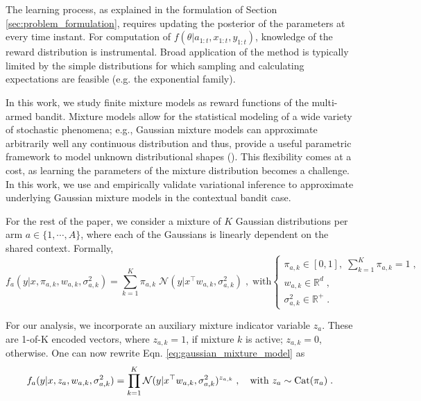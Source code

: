\documentclass[10pt]{article}
\def \Real{{\mathbb R}}
\newcommand{\eg}{e.g. }
\newcommand{\N}{\mathcal{N}}
\newcommand{\Cat}{{\rm Cat}}
\begin{document}
The learning process, as explained in the formulation of Section \ref{sec:problem_formulation}, requires updating the posterior of the parameters at every time instant. For computation of $f(\theta|a_{1:t}, x_{1:t}, y_{1:t})$, knowledge of the reward distribution is instrumental. Broad application of the method is typically limited by the simple distributions for which sampling and calculating expectations are feasible (\eg the exponential family).

In this work, we study finite mixture models as reward functions of the multi-armed bandit. Mixture models allow for the statistical modeling of a wide variety of stochastic phenomena; e.g., Gaussian mixture models can approximate arbitrarily well any continuous distribution and thus, provide a useful parametric framework to model unknown distributional shapes (\cite{b-McLachlan2004}). This flexibility comes at a cost, as learning the parameters of the mixture distribution becomes a challenge. In this work, we use and empirically validate variational inference to approximate underlying Gaussian mixture models in the contextual bandit case.

For the rest of the paper, we consider a mixture of $K$ Gaussian distributions per arm $a \in \{1, \cdots, A\}$, where each of the Gaussians is linearly dependent on the shared context. Formally,
\begin{equation}
f_a(y|x,\pi_{a,k}, w_{a,k}, \sigma_{a,k}^2) =\sum_{k=1}^K \pi_{a,k} \; \N(y|x^\top w_{a,k}, \sigma_{a,k}^2)  \;,
\; \text{with} \begin{cases}
\pi_{a,k}\in [0,1], \; \sum_{k=1}^K \pi_{a,k} = 1 \;,  \\
w_{a,k}\in \Real^{d} \;, \\
\sigma_{a,k}^2\in \Real^+ \;.
\end{cases}
\label{eq:gaussian_mixture_model}
\end{equation}

For our analysis, we incorporate an auxiliary mixture indicator variable $z_a$. These are 1-of-K encoded vectors, where $z_{a,k}=1$, if mixture $k$ is active; $z_{a,k}=0$, otherwise. One can now rewrite Eqn. \ref{eq:gaussian_mixture_model} as
\begin{equation}
f_a(y|x,z_{a},w_{a,k}, \sigma_{a,k}^2) =\prod_{k=1}^K \N(y|x^\top w_{a,k}, \sigma_{a,k}^2)^{z_{a,k}} \;, \quad \text{with } z_{a} \sim \Cat(\pi_{a}) \; .
\label{eq:gaussian_mixture_model_z}
\end{equation}
\end{document}
